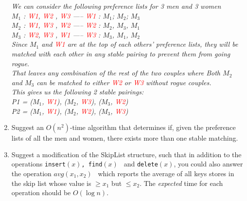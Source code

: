 \documentclass[11pt,epic,leqno,eepic,psfig,]{article}
\newcommand{\ans}[1]{{\color{brown}{\bf\Large Answer:} \sl  #1 \color{black}}}
\renewcommand{\i}{\item}
\begin{document}
\begin{enumerate}
\ans{We can consider the following preference lists for 3 men and 3 women
\\$M_1$ : \textcolor{red}{W1}, \textcolor{red}{W2} , \textcolor{red}{W3}  -----  \textcolor{red}{W1} : $M_1$; $M_2$; $M_3$
\\$M_2$ : \textcolor{red}{W1}, \textcolor{red}{W3} , \textcolor{red}{W2}  -----  \textcolor{red}{W2}  : $M_2$, $M_3$, $M_1$
\\$M_3$ : \textcolor{red}{W2}, \textcolor{red}{W3} , \textcolor{red}{W1}  -----  \textcolor{red}{W3}  : $M_3$, $M_1$, $M_2$
\\Since $M_1$ and  \textcolor{red}{W1}  are at the top of each others' preference lists, they will be matched with each other in any stable pairing to prevent them from going rogue.
\\That leaves any combination of the rest of the two couples where Both $M_2$ and $M_3$ can be matched to either \textcolor{red}{W2} or \textcolor{red}{W3} without rogue couples.
\\ This gives us the following 2 stable pairings:
\\ P1 = ($M_1$, \textcolor{red}{W1}), ($M_2$, \textcolor{red}{W3}), ($M_3$, \textcolor{red}{W2})
\\ P2 = ($M_1$, \textcolor{red}{W1}), ($M_2$, \textcolor{red}{W2}), ($M_3$, \textcolor{red}{W3})}

 \i Suggest an $O(n^2)$-time algorithm that determines if, given the preference lists of all the men and women, there exists more than one stable matching.

  \i Suggest a modification of the SkipList structure, such that in addition to the operations
 { \tt insert$(x)$, find$(x)$ } and {\tt delete$(x)$}, you could also answer the operation {\tt $avg(x_1, x_2)$ } which reports the average of all keys stores in the skip list whose value is $\geq x_1$ but $\leq x_2$.
 The {\em expected}  time for each operation should be $O(\log n)$.



\end{enumerate}
\end{document}
